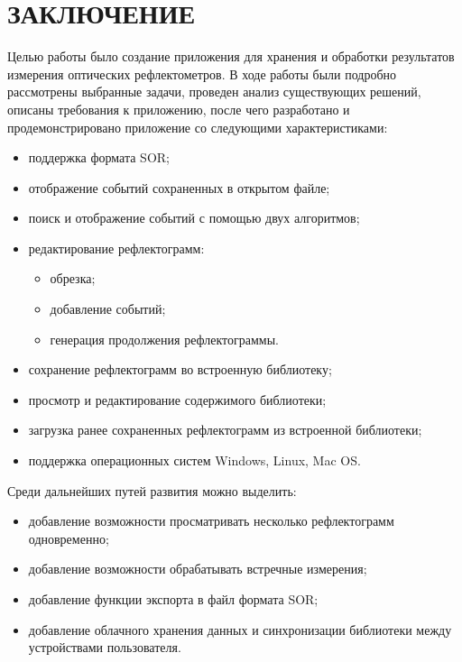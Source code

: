 \documentclass[a4paper]{article}
\begin{document}
\newpage


\newpage


\newpage


\newpage
\section*{ЗАКЛЮЧЕНИЕ}

Целью работы было создание приложения для хранения и обработки результатов измерения оптических рефлектометров. В ходе работы были подробно рассмотрены выбранные задачи, проведен анализ существующих решений, описаны требования к приложению, после чего разработано и продемонстрировано приложение со следующими характеристиками:

\begin{itemize}
  \item поддержка формата SOR;
  \item отображение событий сохраненных в открытом файле;
  \item поиск и отображение событий с помощью двух алгоритмов;
  \item редактирование рефлектограмм:
  \begin{itemize}
    \item обрезка;
    \item добавление событий;
    \item генерация продолжения рефлектограммы.
  \end{itemize}
  \item сохранение рефлектограмм во встроенную библиотеку;
  \item просмотр и редактирование содержимого библиотеки;
  \item загрузка ранее сохраненных рефлектограмм из встроенной библиотеки;
  \item поддержка операционных систем Windows, Linux, Mac OS.
\end{itemize}

\noindent Среди дальнейших путей развития можно выделить:

\begin{itemize}
  \item добавление возможности просматривать несколько рефлектограмм одновременно;
  \item добавление возможности обрабатывать встречные измерения;
  \item добавление функции экспорта в файл формата SOR;
  \item добавление облачного хранения данных и синхронизации библиотеки между устройствами пользователя.
\end{itemize}

\newpage
\printbibliography[
  heading=bibintoc, 
  title={СПИСОК ИСПОЛЬЗОВАННЫХ ИСТОЧНИКОВ}
]

\newpage

\end{document}
